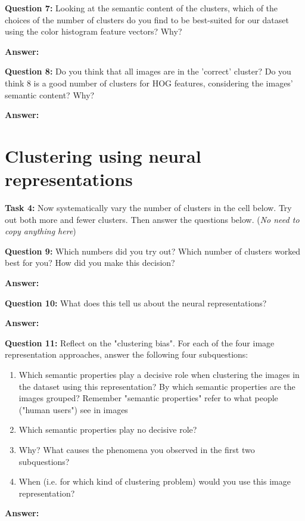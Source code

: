 \documentclass[11pt]{article}
\begin{document}
\noindent\textbf{Question 7:} Looking at the semantic content of the clusters, which of the choices of the number of clusters do you find to be best-suited for our dataset using the color histogram feature vectors? Why?

\textbf{Answer:}


\noindent\textbf{Question 8:} Do you think that all images are in the 'correct' cluster? Do you think 8 is a good number of clusters for HOG features, considering the images' semantic content? Why?

\textbf{Answer:}


\section{Clustering using neural representations}

\textbf{Task 4:} Now systematically vary the number of clusters in the cell below. Try out both more and fewer clusters. Then answer the questions below. (\textit{No need to copy anything here})


\noindent\textbf{Question 9:} Which numbers did you try out? Which number of clusters worked best for you? How did you make this decision?

\textbf{Answer:}


\noindent\textbf{Question 10:} What does this tell us about the neural representations?

\textbf{Answer:}


\noindent\textbf{Question 11:} Reflect on the "clustering bias". For each of the four image representation approaches, answer the following four subquestions:

\begin{enumerate}
\item Which semantic properties play a decisive role when clustering the images in the dataset using this representation? By which semantic properties are the images grouped? Remember "semantic properties" refer to what people ("human users") see in images
\item Which semantic properties play no decisive role?
\item Why? What causes the phenomena you observed in the first two subquestions?
\item When (i.e. for which kind of clustering problem) would you use this image representation?
    
\end{enumerate}
    
\textbf{Answer:}
\end{document}
